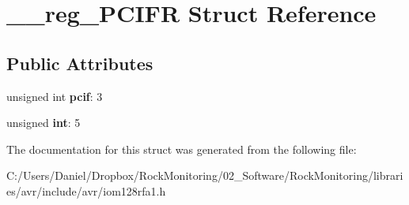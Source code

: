 \hypertarget{struct____reg___p_c_i_f_r}{}\section{\+\_\+\+\_\+reg\+\_\+\+P\+C\+I\+FR Struct Reference}
\label{struct____reg___p_c_i_f_r}
\subsection*{Public Attributes}
\begin{DoxyCompactItemize}
\item 
unsigned int {\bfseries pcif}\+: 3\hypertarget{struct____reg___p_c_i_f_r_abe09041eaeee657880f43125fb36a260}{}\label{struct____reg___p_c_i_f_r_abe09041eaeee657880f43125fb36a260}

\item 
unsigned {\bfseries int}\+: 5\hypertarget{struct____reg___p_c_i_f_r_a7e955a0ce7a2e1f2a9468e6b455c6366}{}\label{struct____reg___p_c_i_f_r_a7e955a0ce7a2e1f2a9468e6b455c6366}

\end{DoxyCompactItemize}


The documentation for this struct was generated from the following file\+:\begin{DoxyCompactItemize}
\item 
C\+:/\+Users/\+Daniel/\+Dropbox/\+Rock\+Monitoring/02\+\_\+\+Software/\+Rock\+Monitoring/libraries/avr/include/avr/iom128rfa1.\+h\end{DoxyCompactItemize}
